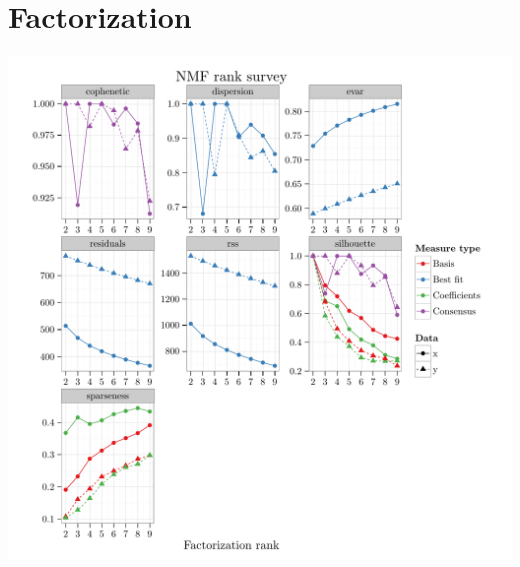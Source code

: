 \documentclass{article}
\begin{document}
\section{Factorization}
\begin{knitrout}
\color{fgcolor}\begin{kframe}
\begin{alltt}
\hlstd{(nmf.runs.rank, nmf.runs.rank.random[[}\hlstd{]])}
\end{alltt}
\end{kframe}

{\centering \includegraphics[width=\maxwidth]{figure/nmf-rank-plots-1} 

}



\end{knitrout}
\end{document}
